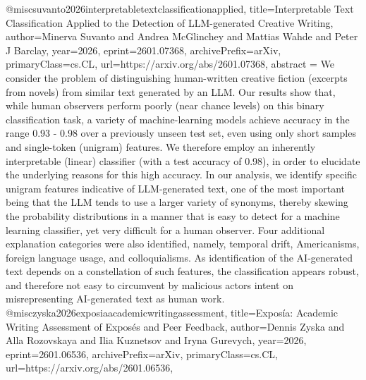 {}@misc{suvanto2026interpretabletextclassificationapplied,
      title={Interpretable Text Classification Applied to the Detection of LLM-generated Creative Writing}, 
      author={Minerva Suvanto and Andrea McGlinchey and Mattias Wahde and Peter J Barclay},
      year={2026},
      eprint={2601.07368},
      archivePrefix={arXiv},
      primaryClass={cs.CL},
      url={https://arxiv.org/abs/2601.07368},
      abstract = {We consider the problem of distinguishing human-written creative fiction (excerpts from novels) from similar text generated by an LLM. Our results show that, while human observers perform poorly (near chance levels) on this binary classification task, a variety of machine-learning models achieve accuracy in the range 0.93 - 0.98 over a previously unseen test set, even using only short samples and single-token (unigram) features. We therefore employ an inherently interpretable (linear) classifier (with a test accuracy of 0.98), in order to elucidate the underlying reasons for this high accuracy. In our analysis, we identify specific unigram features indicative of LLM-generated text, one of the most important being that the LLM tends to use a larger variety of synonyms, thereby skewing the probability distributions in a manner that is easy to detect for a machine learning classifier, yet very difficult for a human observer. Four additional explanation categories were also identified, namely, temporal drift, Americanisms, foreign language usage, and colloquialisms. As identification of the AI-generated text depends on a constellation of such features, the classification appears robust, and therefore not easy to circumvent by malicious actors intent on misrepresenting AI-generated text as human work.}
}@misc{zyska2026exposiaacademicwritingassessment,
      title={Expos\'ia: Academic Writing Assessment of Expos\'es and Peer Feedback}, 
      author={Dennis Zyska and Alla Rozovskaya and Ilia Kuznetsov and Iryna Gurevych},
      year={2026},
      eprint={2601.06536},
      archivePrefix={arXiv},
      primaryClass={cs.CL},
      url={https://arxiv.org/abs/2601.06536},
}
